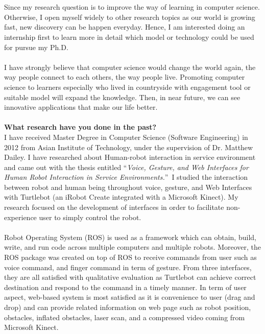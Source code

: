 \documentclass[11pt,a4paper,roman]{moderncv}        %
\begin{document}
\\
\\
Since my research question is to improve the way of learning in computer science. Otherwise, I open myself widely to other research topics as our world is growing fast, new discovery can be happen everyday. Hence, I am interested doing an internship first to learn more in detail which model or technology could be used for pursue my Ph.D. 
\\
\\
I have strongly believe that computer science would change the world again, the way people connect to each others, the way people live. Promoting computer science to learners especially who lived in countryside  with engagement tool or suitable model will expand the knowledge. Then, in near future, we can see innovative applications that make our life better. 
\\
\\
\textbf{What research have you done in the past?}
\\
I have received Master Degree in Computer Science (Software Engineering) in 2012 from Asian Institute of Technology, under the supervision of Dr. Matthew Dailey. I have researched about Human-robot interaction in service environment and came out with the thesis entitled ``\emph{Voice, Gesture, and Web Interfaces for Human Robot Interaction in Service Environments.}''\ I studied the interaction between robot and human being throughout voice, gesture, and Web Interfaces with Turtlebot (an iRobot Create integrated with a Microsoft Kinect). My research focused on the development of interfaces in order to facilitate non-experience user to simply control the robot. 
\\
\\
Robot Operating System (ROS) is used as a framework which can obtain, build, write, and run code across multiple computers and multiple robots. Moreover, the ROS package was created on top of ROS to receive commands from user such as voice command, and finger command in term of gesture. From three interfaces, they are all satisfied with qualitative evaluation as Turtlebot can achieve correct destination and respond to the command in a timely manner. In term of user aspect, web-based system is most satisfied as it is convenience to user (drag and drop) and can provide related information on web page such as robot position, obstacles, inflated obstacles, laser scan, and a compressed video coming from Microsoft Kinect.
\\
\\
\end{document}
